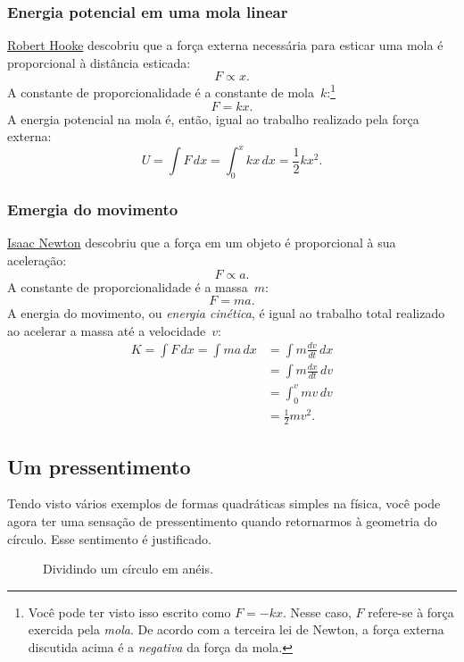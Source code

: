 {    \subsubsection{Energia potencial em uma mola linear} %
    \label{sec:potential_energy_in_a_linear_spring}

\href{https://pt.wikipedia.org/wiki/Robert_Hooke}{Robert Hooke} descobriu que a força externa necessária para esticar uma mola é proporcional à distância esticada:
\[ F \propto x. \]
A constante de proporcionalidade é a constante de mola~$k$:\footnote{Você pode ter visto isso escrito como $F = -kx$. Nesse caso, $F$ refere-se à força exercida pela \emph{mola}. De acordo com a terceira lei de Newton, a força externa discutida acima é a \emph{negativa} da força da mola.}
\[ F = k x. \]
A energia potencial na mola é, então, igual ao trabalho realizado pela força externa:
\[ U = \int F\,dx = \int_0^x kx\,dx = \textstyle{\frac{1}{2}} kx^2. \]

    \subsubsection{Emergia do movimento} %
    \label{sec:energy_of_motion}

\href{https://pt.wikipedia.org/wiki/Isaac_Newton}{Isaac Newton} descobriu que a força em um objeto é proporcional à sua aceleração:
\[ F \propto a. \]
A constante de proporcionalidade é a massa~$m$:
\[ F = m a. \]
A energia do movimento, ou \emph{energia cinética}, é igual ao trabalho total realizado ao acelerar a massa até a velocidade~$v$:
\[
\begin{split}
K = \int F\,dx = \int ma\,dx & = \int m\frac{dv}{dt}\,dx \\ & = \int m\frac{dx}{dt}\,dv \\ & = \int_0^v mv\,dv \\ & = \textstyle{\frac{1}{2}} mv^2.
\end{split}
\]

  \subsection{Um pressentimento} %
  \label{sec:a_sense_of_foreboding}

Tendo visto vários exemplos de formas quadráticas simples na física, você pode agora ter uma sensação de pressentimento quando retornarmos à geometria do círculo. Esse sentimento é justificado.

\begin{figure}
\begin{center}
\end{center}
\caption{Dividindo um círculo em anéis.\label{fig:circular_area}}
\end{figure}


}
